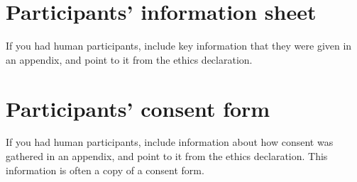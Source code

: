 \documentclass[logo,bsc,singlespacing,parskip]{infthesis}
\begin{document}
\chapter{Participants' information sheet}

If you had human participants, include key information that they were given in
an appendix, and point to it from the ethics declaration.

\chapter{Participants' consent form}

If you had human participants, include information about how consent was
gathered in an appendix, and point to it from the ethics declaration.
This information is often a copy of a consent form.
\end{document}

